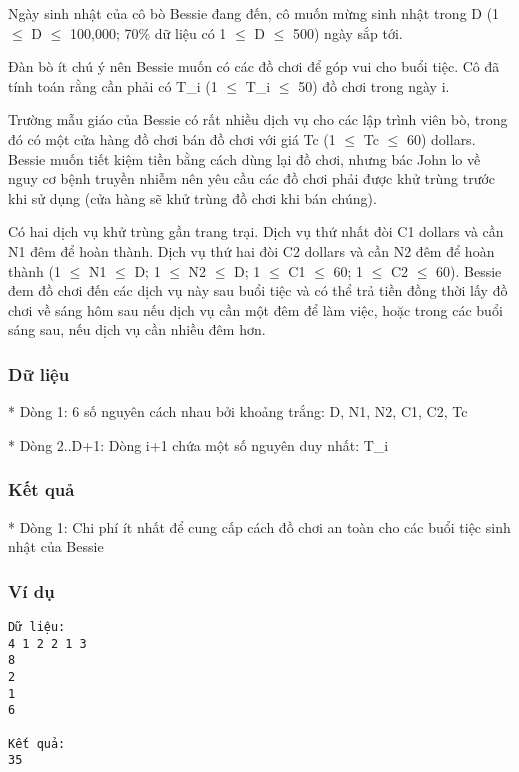 



   Ngày sinh nhật của cô bò Bessie đang đến, cô muốn mừng sinh nhật trong D (1  $\le$  D  $\le$  100,000; 70\% dữ liệu có 1  $\le$  D  $\le$  500) ngày sắp tới.  

   Đàn bò ít chú ý nên Bessie muốn có các đồ chơi để góp vui cho buổi tiệc. Cô đã tính toán rằng cần phải có T\_i (1  $\le$  T\_i  $\le$  50) đồ chơi trong ngày i.  

   Trường mẫu giáo của Bessie có rất nhiều dịch vụ cho các lập trình viên bò, trong đó có một cửa hàng đồ chơi bán đồ chơi với giá Tc (1  $\le$  Tc  $\le$  60) dollars. Bessie muốn tiết kiệm tiền bằng cách dùng lại đồ chơi, nhưng bác John lo về nguy cơ bệnh truyền nhiễm nên yêu cầu các đồ chơi phải được khử trùng trước khi sử dụng (cửa hàng sẽ khử trùng đồ chơi khi bán chúng).  

   Có hai dịch vụ khử trùng gần trang trại. Dịch vụ thứ nhất đòi C1 dollars và cần N1 đêm để hoàn thành. Dịch vụ thứ hai đòi C2 dollars và cần N2 đêm để hoàn thành (1  $\le$  N1  $\le$  D; 1  $\le$  N2  $\le$  D; 1  $\le$  C1  $\le$  60; 1  $\le$  C2  $\le$  60). Bessie đem đồ chơi đến các dịch vụ này sau buổi tiệc và có thể trả tiền đồng thời lấy đồ chơi về sáng hôm sau nếu dịch vụ cần một đêm để làm việc, hoặc trong các buổi sáng sau, nếu dịch vụ cần nhiều đêm hơn.  

\subsubsection{    Dữ liệu   }

    * Dòng 1: 6 số nguyên cách nhau bởi khoảng trắng: D, N1, N2, C1, C2, Tc   

    * Dòng 2..D+1: Dòng i+1 chứa một số nguyên duy nhất: T\_i   

\subsubsection{    Kết quả   }

    * Dòng 1: Chi phí ít nhất để cung cấp cách đồ chơi an toàn cho các buổi tiệc sinh nhật của Bessie   

\subsubsection{    Ví dụ   }
\begin{verbatim}
Dữ liệu:
4 1 2 2 1 3
8
2
1
6

Kết quả:
35
\end{verbatim}
